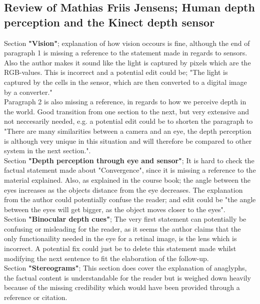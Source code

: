 \subsection{Review of Mathias Friis Jensens; Human depth perception and the Kinect depth sensor}

Section \textbf{"Vision"}; explanation of how vision occours is fine, although the end of paragraph 1 is missing a reference to the statement made in regards to sensors. Also the author makes it sound like the light is captured by pixels which are the RGB-values. This is incorrect and a potential edit could be; "The light is captured by the cells in the sensor, which are then converted to a digital image by a converter."\\Paragraph 2 is also missing a reference, in regards to how we perceive depth in the world. Good transition from one section to the next, but very extensive and not neccesarily needed, e.g. a potential edit could be to shorten the paragraph to "There are many similarities between a camera and an eye, the depth perception is although very unique in this situation and will therefore be compared to other system in the next section.".\\

Section \textbf{"Depth perception through eye and sensor"}; It is hard to check the factual statement made about "Convergence", since it is missing a reference to the material explained. Also, as explained in the course book; the angle between the eyes increases as the objects distance from the eye decreases. The explanation from the author could potentially confuse the reader; and edit could be "the angle between the eyes will get bigger, as the object moves closer to the eyes".\\

Section \textbf{"Binocular depth cues"}; The very first statement can potentially be confusing or misleading for the reader, as it seems the author claims that the only functionaility needed in the eye for a retinal image, is the lens which is incorrect. A potential fix could just be to delete this statement made whilst modifying the next sentence to fit the elaboration of the follow-up.\\

Section \textbf{"Stereograms"}; This section does cover the explanation of anaglyphs, the factual content is understandable for the reader but is weighed down heavily because of the missing credibility which would have been provided through a reference or citation.\\

